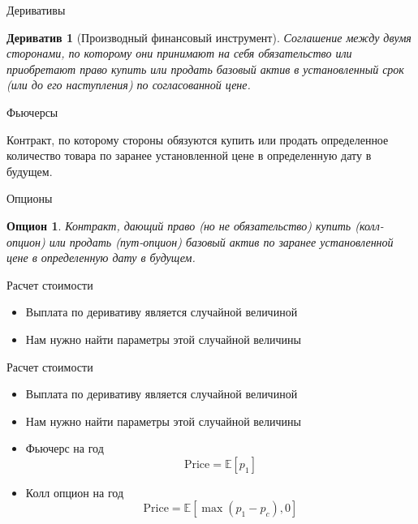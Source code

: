 \documentclass{beamer}
\newtheorem{derivative*}{Дериватив}
\newtheorem{option*}{Опцион}
\newcommand{\E}{\ensuremath{\mathbb{E}}}
\begin{document}
        \begin{frame}{Деривативы}
            \begin{derivative*}[Производный финансовый инструмент]
                Соглашение между двумя сторонами, по которому они принимают на себя обязательство или приобретают право купить или продать базовый актив в установленный срок (или до его наступления) по согласованной цене.
            \end{derivative*}
        \end{frame}

        \begin{frame}{Фьючерсы}
            \begin{futures*}
                Контракт, по которому стороны обязуются купить или продать определенное количество товара по заранее установленной цене в определенную дату в будущем.
            \end{futures*}
        \end{frame}

        \begin{frame}{Опционы}
            \begin{option*}
                Контракт, дающий право (но не обязательство) купить (колл-опцион) или продать (пут-опцион) базовый актив по заранее установленной цене в определенную дату в будущем.
            \end{option*}
        \end{frame}

        \begin{frame}{Расчет стоимости}
            \begin{itemize}
                \item Выплата по деривативу является случайной величиной
                \item Нам нужно найти параметры этой случайной величины
            \end{itemize}
        \end{frame}

        \begin{frame}{Расчет стоимости}
            \begin{itemize}
                \item Выплата по деривативу является случайной величиной
                \item Нам нужно найти параметры этой случайной величины
            \end{itemize}
            \begin{itemize}
                \item Фьючерс на год
                \[
                    \mathrm{Price} = \E \left[ p_1 \right]
                \]
                \item Колл опцион на год
                \[
                    \mathrm{Price} = \E \left[ \max{(p_1 - p_c), 0} \right]
                \]
            \end{itemize}
        \end{frame}
\end{document}
